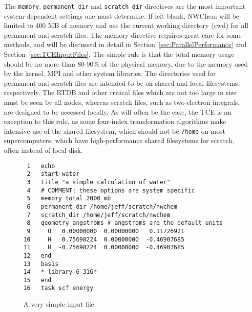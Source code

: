\documentclass[letterpaper,12pt]{article}
\begin{document}
The \texttt{memory}, \texttt{permanent\_dir} and \texttt{scratch\_dir} directives are the most important system-dependent settings one must determine.  If left blank, NWChem will be limited to 400 MB of memory and use the current working directory (cwd) for all permanent and scratch files.  The memory directive requires great care for some methods, and will be discussed in detail in Section~\ref{sec:ParallelPerformance} and Section~\ref{sec:TCEInputFiles}.  The simple rule is that the total memory usage should be no more than 80-90\% of the physical memory, due to the memory used by the kernel, MPI and other system libraries.  The directories used for permanent and scratch files are intended to be on shared and local filesystems, respectively.  The RTDB and other critical files which are not too large in size must be seen by all nodes, whereas scratch files, such as two-electron integrals, are designed to be accessed locally.  As will often be the case, the TCE is an exception to this rule, as some four-index transformation algorithms make intensive use of the shared filesystem, which should not be \texttt{/home} on most supercomputers, which have high-performance shared filesystems for scratch, often instead of local disk.

\begin{figure}
    \caption{A very simple input file.}
    \label{fig:WaterSimple}
    \begin{verbatim}
 1   echo
 2   start water
 3   title "a simple calculation of water"
 4   # COMMENT: these options are system specific
 5   memory total 2000 mb
 6   permanent_dir /home/jeff/scratch/nwchem
 7   scratch_dir /home/jeff/scratch/nwchem
 8   geometry angstroms # angstroms are the default units
 9     O   0.00000000  0.00000000   0.11726921
10     H   0.75698224  0.00000000  -0.46907685
11     H  -0.75698224  0.00000000  -0.46907685
12   end
13   basis
14   * library 6-31G*
15   end
16   task scf energy
    \end{verbatim}
\end{figure}
\end{document}
